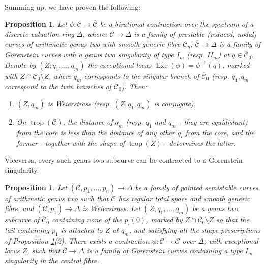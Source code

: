 \documentclass{compositio}
\renewcommand{\to}{\rightarrow}
\newcommand{\dvr}{\Delta}
\newcommand{\Exc}{\operatorname{Exc}}
\theoremstyle{plain}
\newtheorem{prop}[thm]{Proposition}
\theoremstyle{definition}
\theoremstyle{remark}
\begin{document}
 Summing up, we have proven the following:

\begin{prop}\label{prop:tailI}
 Let $\phi\colon\mathcal C\to\overline{\mathcal C}$ be a birational contraction over the spectrum of a discrete valuation ring $\dvr$, where: $\mathcal C\to \dvr$ is a family of prestable (reduced, nodal) curves of arithmetic genus two with smooth generic fibre $\mathcal C_{\eta}$; $\overline{\mathcal C}\to\dvr$ is a family of Gorenstein curves with a genus two singularity of type $I_m$ (resp. $I\!I_m$) at $q\in\overline{\mathcal C}_0$. Denote by $(Z;q_1,\ldots,q_m)$ the exceptional locus $\Exc(\phi)=\phi^{-1}(q)$, marked with $Z\cap\overline{\mathcal C_0\setminus Z}$, where $q_m$ corresponds to the singular branch of $\overline{\mathcal C}_0$ (resp. $q_1,q_m$ correspond to the twin branches of $\overline{\mathcal C}_0$). Then:
 \begin{enumerate}[leftmargin=.6cm]
  \item $(Z,q_m)$ is Weierstrass (resp. $(Z,q_1,q_m)$ is conjugate).
  \item On $\operatorname{trop}(\mathcal C)$, the distance of $q_m$ (resp. $q_1$ and $q_m$ - they are equidistant) from the core is less than the distance of any other $q_i$ from the core, and the former - together with the shape of $\operatorname{trop}(Z)$ - determines the latter.
 \end{enumerate}
\end{prop}

Viceversa, every such genus two subcurve can be contracted to a Gorenstein singularity.

\begin{prop}\label{prop:contractionI}
 Let $(\mathcal C,p_1,\ldots,p_n)\to\dvr$ be a family of pointed semistable curves of arithmetic genus two such that $\mathcal C$ has regular total space and smooth generic fibre, and $(\mathcal C,p_1)\to \Delta$ is Weierstrass. Let $(Z,q_1,\ldots,q_m)$ be a genus two subcurve of $\mathcal C_0$ containing none of the $p_i(0)$, marked by $Z\cap \overline{\mathcal C_0\setminus Z}$ so that the tail containing $p_1$ is attached to $Z$ at $q_m$, and satisfying all the shape prescriptions of Proposition \ref{prop:tailI}(2). There exists a contraction $\phi\colon\mathcal C\to\overline{\mathcal C}$ over $\dvr$, with exceptional locus $Z$, such that $\overline{\mathcal C}\to\dvr$ is a family of Gorenstein curves containing a type $I_m$ singularity in the central fibre.
\end{prop}
\end{document}
